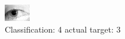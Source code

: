\begin{figure}[h!]
\begin{center}
\includegraphics[width=0.60\columnwidth]{figures/ID1272_class_4_target_3.png}
\end{center}
\caption{ Classification: 4 actual target: 3}
\label{fig:ID1272_class_4_target_3}
\end{figure}
